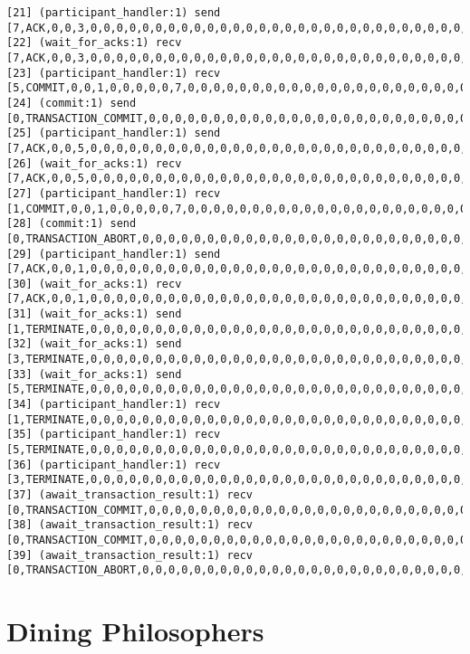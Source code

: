 \begin{lstlisting}[xleftmargin=.01\linewidth, xrightmargin=0.01\linewidth, caption={Message passing caused by the proposer's protocol bug.}, label={lst:paxos_bug}]
[21] (participant_handler:1) send [7,ACK,0,0,3,0,0,0,0,0,0,0,0,0,0,0,0,0,0,0,0,0,0,0,0,0,0,0,0,0,0,0,0,0,0,0,0,0]
[22] (wait_for_acks:1) recv [7,ACK,0,0,3,0,0,0,0,0,0,0,0,0,0,0,0,0,0,0,0,0,0,0,0,0,0,0,0,0,0,0,0,0,0,0,0,0]
[23] (participant_handler:1) recv [5,COMMIT,0,0,1,0,0,0,0,0,7,0,0,0,0,0,0,0,0,0,0,0,0,0,0,0,0,0,0,0,0,0,0,0,0,0,0,0]
[24] (commit:1) send [0,TRANSACTION_COMMIT,0,0,0,0,0,0,0,0,0,0,0,0,0,0,0,0,0,0,0,0,0,0,0,0,0,0,0,0,0,0,0,0,0,0,0,0]
[25] (participant_handler:1) send [7,ACK,0,0,5,0,0,0,0,0,0,0,0,0,0,0,0,0,0,0,0,0,0,0,0,0,0,0,0,0,0,0,0,0,0,0,0,0]
[26] (wait_for_acks:1) recv [7,ACK,0,0,5,0,0,0,0,0,0,0,0,0,0,0,0,0,0,0,0,0,0,0,0,0,0,0,0,0,0,0,0,0,0,0,0,0]
[27] (participant_handler:1) recv [1,COMMIT,0,0,1,0,0,0,0,0,7,0,0,0,0,0,0,0,0,0,0,0,0,0,0,0,0,0,0,0,0,0,0,0,0,0,0,0]
[28] (commit:1) send [0,TRANSACTION_ABORT,0,0,0,0,0,0,0,0,0,0,0,0,0,0,0,0,0,0,0,0,0,0,0,0,0,0,0,0,0,0,0,0,0,0,0,0]
[29] (participant_handler:1) send [7,ACK,0,0,1,0,0,0,0,0,0,0,0,0,0,0,0,0,0,0,0,0,0,0,0,0,0,0,0,0,0,0,0,0,0,0,0,0]
[30] (wait_for_acks:1) recv [7,ACK,0,0,1,0,0,0,0,0,0,0,0,0,0,0,0,0,0,0,0,0,0,0,0,0,0,0,0,0,0,0,0,0,0,0,0,0]
[31] (wait_for_acks:1) send [1,TERMINATE,0,0,0,0,0,0,0,0,0,0,0,0,0,0,0,0,0,0,0,0,0,0,0,0,0,0,0,0,0,0,0,0,0,0,0,0]
[32] (wait_for_acks:1) send [3,TERMINATE,0,0,0,0,0,0,0,0,0,0,0,0,0,0,0,0,0,0,0,0,0,0,0,0,0,0,0,0,0,0,0,0,0,0,0,0]
[33] (wait_for_acks:1) send [5,TERMINATE,0,0,0,0,0,0,0,0,0,0,0,0,0,0,0,0,0,0,0,0,0,0,0,0,0,0,0,0,0,0,0,0,0,0,0,0]
[34] (participant_handler:1) recv [1,TERMINATE,0,0,0,0,0,0,0,0,0,0,0,0,0,0,0,0,0,0,0,0,0,0,0,0,0,0,0,0,0,0,0,0,0,0,0,0]
[35] (participant_handler:1) recv [5,TERMINATE,0,0,0,0,0,0,0,0,0,0,0,0,0,0,0,0,0,0,0,0,0,0,0,0,0,0,0,0,0,0,0,0,0,0,0,0]
[36] (participant_handler:1) recv [3,TERMINATE,0,0,0,0,0,0,0,0,0,0,0,0,0,0,0,0,0,0,0,0,0,0,0,0,0,0,0,0,0,0,0,0,0,0,0,0]
[37] (await_transaction_result:1) recv [0,TRANSACTION_COMMIT,0,0,0,0,0,0,0,0,0,0,0,0,0,0,0,0,0,0,0,0,0,0,0,0,0,0,0,0,0,0,0,0,0,0,0,0]
[38] (await_transaction_result:1) recv [0,TRANSACTION_COMMIT,0,0,0,0,0,0,0,0,0,0,0,0,0,0,0,0,0,0,0,0,0,0,0,0,0,0,0,0,0,0,0,0,0,0,0,0]
[39] (await_transaction_result:1) recv [0,TRANSACTION_ABORT,0,0,0,0,0,0,0,0,0,0,0,0,0,0,0,0,0,0,0,0,0,0,0,0,0,0,0,0,0,0,0,0,0,0,0,0]
\end{lstlisting}

\section{Dining Philosophers}
